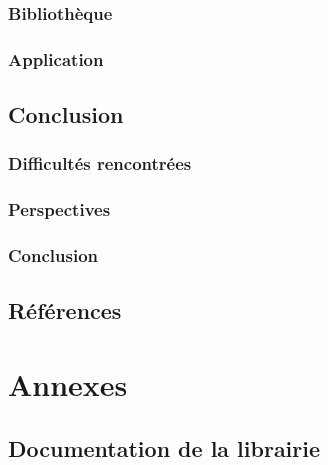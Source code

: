 \documentclass{report}
\begin{document}
		\section{Bibliothèque}
		\section{Application}
	
	\chapter{Conclusion}
		\section{Difficultés rencontrées}
		\section{Perspectives}
		\section{Conclusion}
	
	\chapter{Références}
	
	\part{Annexes}
	\appendix
		\chapter{Documentation de la librairie}	
\end{document}
